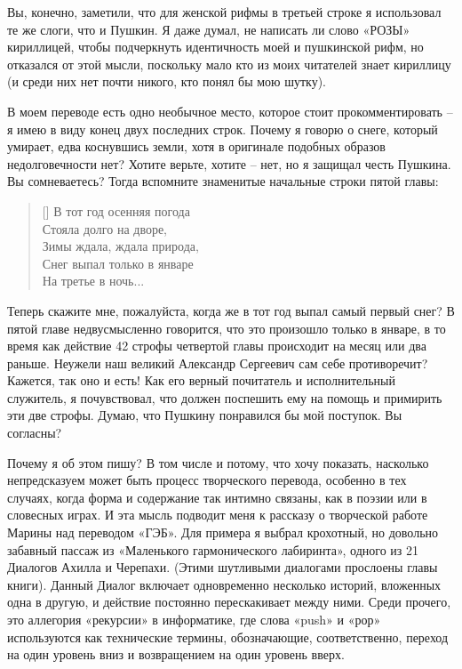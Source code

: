 \documentclass[../main.tex]{subfiles}
\begin{document}
Вы, конечно, заметили, что для женской рифмы в третьей строке я использовал те же слоги, что и Пушкин. Я даже думал, не написать ли слово «РОЗЫ» кириллицей, чтобы подчеркнуть идентичность моей и пушкинской рифм, но отказался от этой мысли, поскольку мало кто из моих читателей знает кириллицу (и среди них нет почти никого, кто понял бы мою шутку).

В моем переводе есть одно необычное место, которое стоит прокомментировать \--- я имею в виду конец двух последних строк. Почему я говорю о снеге, который умирает, едва коснувшись земли, хотя в оригинале подобных образов недолговечности нет? Хотите верьте, хотите \--- нет, но я защищал честь Пушкина. Вы сомневаетесь? Тогда вспомните знаменитые начальные строки пятой главы:

\settowidth{\versewidth}{Зимы ждала, ждала природа,}
\begin{verse}[\versewidth]
    В тот год осенняя погода \\
    Стояла долго на дворе, \\
    Зимы ждала, ждала природа, \\
    Снег выпал только в январе \\
    На третье в ночь...
\end{verse}

Теперь скажите мне, пожалуйста, когда же в тот год выпал самый первый снег? В пятой главе недвусмысленно говорится, что это произошло только в январе, в то время как действие 42 строфы четвертой главы происходит на месяц или два раньше. Неужели наш великий Александр Сергеевич сам себе противоречит? Кажется, так оно и есть! Как его верный почитатель и исполнительный служитель, я почувствовал, что должен поспешить ему на помощь и примирить эти две строфы. Думаю, что Пушкину понравился бы мой поступок. Вы согласны?

Почему я об этом пишу? В том числе и потому, что хочу показать, насколько непредсказуем может быть процесс творческого перевода, особенно в тех случаях, когда форма и содержание так интимно связаны, как в поэзии или в словесных играх. И эта мысль подводит меня к рассказу о творческой работе Марины над переводом «ГЭБ». Для примера я выбрал крохотный, но довольно забавный пассаж из «Маленького гармонического лабиринта», одного из 21 Диалогов Ахилла и Черепахи. (Этими шутливыми диалогами прослоены главы книги). Данный Диалог включает одновременно несколько историй, вложенных одна в другую, и действие постоянно перескакивает между ними. Среди прочего, это аллегория «рекурсии» в информатике, где слова «push» и «рор» используются как технические термины, обозначающие, соответственно, переход на один уровень вниз и возвращением на один уровень вверх.
\end{document}
